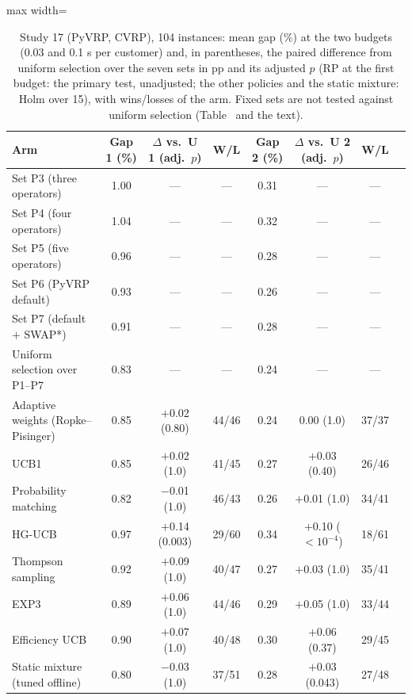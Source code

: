 \begin{table}[t]
\caption{Study 17 (PyVRP, CVRP), 104 instances: mean gap (\%) at the two budgets (0.03 and 0.1 s per customer) and, in parentheses, the paired difference from uniform selection over the seven sets in pp and its adjusted $p$ (RP at the first budget: the primary test, unadjusted; the other policies and the static mixture: Holm over 15), with wins/losses of the arm. Fixed sets are not tested against uniform selection (Table~ and the text).}\label{tab:s17a}
\centering
\small
\begin{adjustbox}{max width=\linewidth}
\begin{tabular}{lccccccc}
\toprule
Arm & Gap 1 (\%) & $\Delta$ vs.\ U 1 (adj.\ $p$) & W/L & Gap 2 (\%) & $\Delta$ vs.\ U 2 (adj.\ $p$) & W/L \\
\midrule
Set P3 (three operators) & 1.00 & --- & --- & 0.31 & --- & --- \\
Set P4 (four operators) & 1.04 & --- & --- & 0.32 & --- & --- \\
Set P5 (five operators) & 0.96 & --- & --- & 0.28 & --- & --- \\
Set P6 (PyVRP default) & 0.93 & --- & --- & 0.26 & --- & --- \\
Set P7 (default $+$ SWAP*) & 0.91 & --- & --- & 0.28 & --- & --- \\
Uniform selection over P1--P7 & 0.83 & --- & --- & 0.24 & --- & --- \\
Adaptive weights (Ropke--Pisinger) & 0.85 & $+$0.02 (0.80) & 44/46 & 0.24 & 0.00 (1.0) & 37/37 \\
UCB1 & 0.85 & $+$0.02 (1.0) & 41/45 & 0.27 & $+$0.03 (0.40) & 26/46 \\
Probability matching & 0.82 & $-$0.01 (1.0) & 46/43 & 0.26 & $+$0.01 (1.0) & 34/41 \\
HG-UCB & 0.97 & $+$0.14 (0.003) & 29/60 & 0.34 & $+$0.10 (\ensuremath{<10^{-4}}) & 18/61 \\
Thompson sampling & 0.92 & $+$0.09 (1.0) & 40/47 & 0.27 & $+$0.03 (1.0) & 35/41 \\
EXP3 & 0.89 & $+$0.06 (1.0) & 44/46 & 0.29 & $+$0.05 (1.0) & 33/44 \\
Efficiency UCB & 0.90 & $+$0.07 (1.0) & 40/48 & 0.30 & $+$0.06 (0.37) & 29/45 \\
Static mixture (tuned offline) & 0.80 & $-$0.03 (1.0) & 37/51 & 0.28 & $+$0.03 (0.043) & 27/48 \\
\bottomrule
\end{tabular}
\end{adjustbox}
\end{table}

